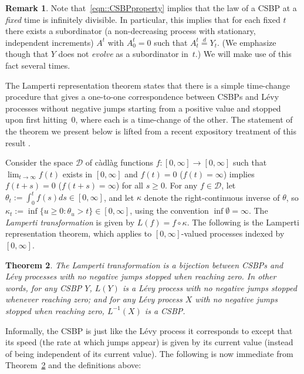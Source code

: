 \documentclass[10pt]{amsart}
\let\mathcal\mathscr
\theoremstyle{plain}
\newtheorem{theorem}{Theorem}
\numberwithin{theorem}{section}
\theoremstyle{definition}
\newtheorem{remark}[theorem]{Remark}
\newcommand{\cadlag}{càdlàg}
\begin{document}
\begin{remark}
\label{rem::CSBPsubordinator}
Note that~\eqref{eqn::CSBPproperty} implies that the law of a CSBP at a \emph{fixed} time is infinitely divisible. In particular, this implies that for each fixed $t$ there exists a subordinator (\ie a non-decreasing process with stationary, independent increments) $A^t$ with $A_0^t = 0$ such that $A_t^t \stackrel{d}{=} Y_t$. (We emphasize though that $Y$ does not \emph{evolve} as a subordinator in~$t$.) We will make use of this fact several times.
\end{remark}

The Lamperti representation theorem states that there is a simple time-change procedure that gives a one-to-one correspondence between CSBPs and Lévy processes without negative jumps starting from a positive value and stopped upon first hitting~$0$, where each is a time-change of the other. The statement of the theorem we present below is lifted from a recent expository treatment of this result \cite{surveyproofoflampertirepresentation}.

Consider the space $\mathcal D$ of {\cadlag} functions $f\colon [0,\infty] \to [0,\infty]$ such that $\lim_{t \to \infty} f(t)$ exists in $[0,\infty]$ and $f(t) = 0$ (\resp $f(t) = \infty$) implies $f(t+s) = 0$ (\resp $f(t+s)= \infty$) for all $s \geq 0$. For any $f \in \mathcal D$, let $\theta_t := \int_0^t f(s) ds \in [0,\infty]$, and let $\kappa$ denote the right-continuous inverse of $\theta$, so $\kappa_t := \inf \{u \geq 0 : \theta_u > t \} \in [0,\infty]$, using the convention $\inf \emptyset = \infty$. The \emph{Lamperti transformation} is given by $L(f) = f \circ \kappa$. The following is the Lamperti representation theorem, which applies to $[0,\infty]$-valued processes indexed by $[0,\infty]$.

\begin{theorem}
\label{thm::lamperti}
The Lamperti transformation is a bijection between CSBPs and Lévy processes with no negative jumps stopped when reaching zero. In other words, for any CSBP $Y$, $L(Y)$ is a Lévy process with no negative jumps stopped whenever reaching zero; and for any Lévy process $X$ with no negative jumps stopped when reaching zero, $L^{-1}(X)$ is a CSBP.
\end{theorem}

Informally, the CSBP is just like the Lévy process it corresponds to except that its speed (the rate at which jumps appear) is given by its current value (instead of being independent of its current value). The following is now immediate from Theorem~\ref{thm::lamperti} and the definitions above:
\end{document}
